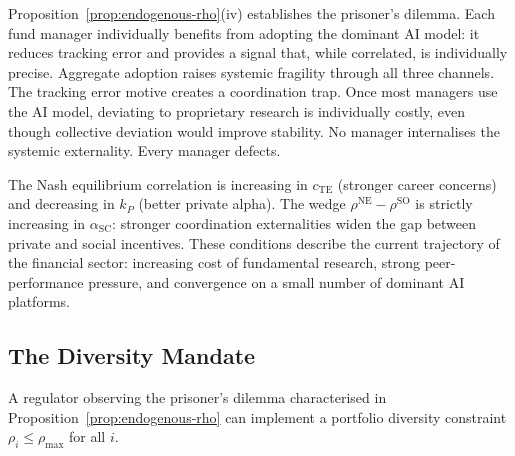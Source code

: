 Proposition~\ref{prop:endogenous-rho}(iv) establishes the prisoner's dilemma. Each fund manager individually benefits from adopting the dominant AI model: it reduces tracking error and provides a signal that, while correlated, is individually precise. Aggregate adoption raises systemic fragility through all three channels. The tracking error motive creates a coordination trap. Once most managers use the AI model, deviating to proprietary research is individually costly, even though collective deviation would improve stability. No manager internalises the systemic externality. Every manager defects.

The Nash equilibrium correlation is increasing in $c_{\text{TE}}$ (stronger career concerns) and decreasing in $k_P$ (better private alpha). The wedge $\rho^{\text{NE}} - \rho^{\text{SO}}$ is strictly increasing in $\alpha_{\text{SC}}$: stronger coordination externalities widen the gap between private and social incentives. These conditions describe the current trajectory of the financial sector: increasing cost of fundamental research, strong peer-performance pressure, and convergence on a small number of dominant AI platforms.

\subsection{The Diversity Mandate}

A regulator observing the prisoner's dilemma characterised in Proposition~\ref{prop:endogenous-rho} can implement a portfolio diversity constraint $\rho_i \leq \rho_{\max}$ for all $i$.

